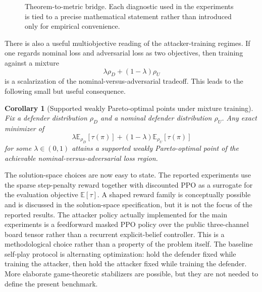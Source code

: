 \documentclass[11pt]{article}
\newtheorem{corollary}{Corollary}
\newcommand{\E}{\mathbb{E}}
\newcommand{\tauT}{\tau}
\begin{document}
\begin{figure}[t]
\caption{Theorem-to-metric bridge. Each diagnostic used in the experiments is tied to a precise mathematical statement rather than introduced only for empirical convenience.}
\label{fig:diagram_theorem_bridge}
\end{figure}
\FloatBarrier

There is also a useful multiobjective reading of the attacker-training regimes. If one regards nominal loss and adversarial loss as two objectives, then training against a mixture
\[
\lambda \rho_D + (1-\lambda)\rho_U
\]
is a scalarization of the nominal-versus-adversarial tradeoff. This leads to the following small but useful consequence.

\begin{corollary}[Supported weakly Pareto-optimal points under mixture training]
Fix a defender distribution $\rho_D$ and a nominal defender distribution $\rho_U$. Any exact minimizer of
\[
\lambda \E_{\rho_D}[\tauT(\pi)] + (1-\lambda)\E_{\rho_U}[\tauT(\pi)]
\]
for some $\lambda\in(0,1)$ attains a supported weakly Pareto-optimal point of the achievable nominal-versus-adversarial loss region.
\end{corollary}

The solution-space choices are now easy to state. The reported experiments use the sparse step-penalty reward together with discounted PPO as a surrogate for the evaluation objective $\E[\tauT]$. A shaped reward family is conceptually possible and is discussed in the solution-space specification, but it is not the focus of the reported results. The attacker policy actually implemented for the main experiments is a feedforward masked PPO policy over the public three-channel board tensor rather than a recurrent explicit-belief controller. This is a methodological choice rather than a property of the problem itself. The baseline self-play protocol is alternating optimization: hold the defender fixed while training the attacker, then hold the attacker fixed while training the defender. More elaborate game-theoretic stabilizers are possible, but they are not needed to define the present benchmark.
\end{document}
